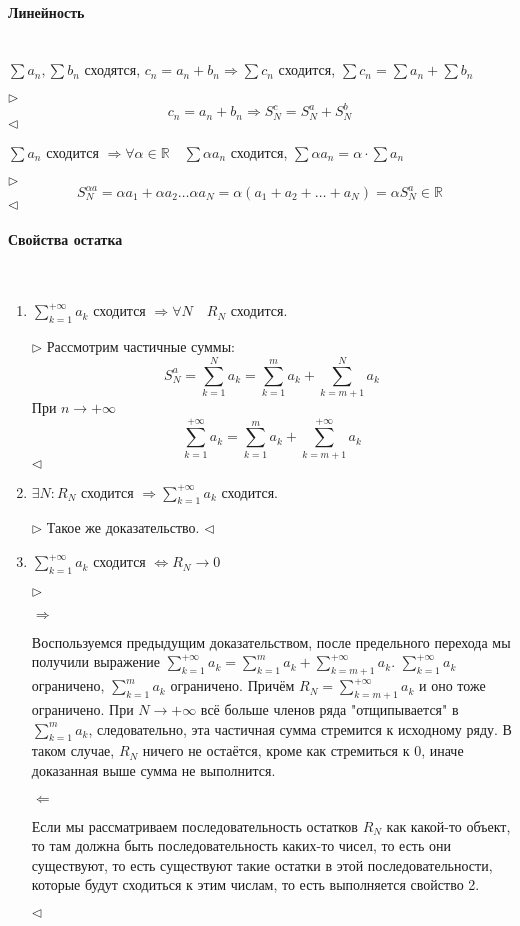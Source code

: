 \documentclass{article}
\let\vanillaparagraph\paragraph
\renewcommand{\paragraph}[1]{\vanillaparagraph{#1}\mbox{}\\}
\begin{document}
\paragraph{Линейность}
$\sum a_n, \sum b_n$ сходятся, $c_n = a_n + b_n \Rightarrow \sum c_n$ сходится, $\sum c_n = \sum a_n + \sum b_n$

$\rhd$
$$
c_n = a_n + b_n \Rightarrow S_N^c = S_N^a + S_N^b
$$
$\lhd$

$\sum a_n$ сходится $\Rightarrow \forall \alpha \in \mathbb{R} \quad \sum \alpha a_n$ сходится, $\sum \alpha a_n = \alpha \cdot \sum a_n$

$\rhd$
$$
S_N^{\alpha a} = \alpha a_1 + \alpha a_2 \ldots \alpha a_N = \alpha (a_1 + a_2 + \ldots + a_N) = \alpha S_N^a \in \mathbb{R}
$$
$\lhd$
\paragraph{Свойства остатка}
\begin{enumerate}
    \item $\sum_{k=1}^{+\infty} a_k$ сходится $\Rightarrow \forall N \quad R_N$ сходится.
    
    $\rhd$
    Рассмотрим частичные суммы:
    $$
    S_N^a = \sum_{k=1}^N a_k = \sum_{k=1}^m a_k + \sum_{k=m+1}^N a_k
    $$
    При $n \rightarrow +\infty$
    $$
    \sum_{k=1}^{+\infty} a_k = \sum_{k=1}^m a_k + \sum_{k=m+1}^{+\infty} a_k
    $$
    $\lhd$
    
    \item $\exists N : R_N$ сходится $\Rightarrow \sum_{k=1}^{+\infty} a_k$ сходится.
    
    $\rhd$
    Такое же доказательство.
    $\lhd$
    
    \item $\sum_{k=1}^{+\infty} a_k$ сходится $\Leftrightarrow R_N \rightarrow 0$
    
    $\rhd$
    
    $\Rightarrow$

    Воспользуемся предыдущим доказательством, после предельного перехода мы получили выражение $\sum_{k=1}^{+\infty} a_k = \sum_{k=1}^m a_k + \sum_{k=m+1}^{+\infty} a_k$. $\sum_{k=1}^{+\infty} a_k$ ограничено, $\sum_{k=1}^m a_k$ ограничено. Причём $R_N = \sum_{k=m+1}^{+\infty} a_k$ и оно тоже ограничено. При $N \rightarrow +\infty$ всё больше членов ряда "отщипывается" в $\sum_{k=1}^m a_k$, следовательно, эта частичная сумма стремится к исходному ряду. В таком случае, $R_N$ ничего не остаётся, кроме как стремиться к 0, иначе доказанная выше сумма не выполнится.

    $\Leftarrow$
    
    Если мы рассматриваем последовательность остатков $R_N$ как какой-то объект, то там должна быть последовательность каких-то чисел, то есть они существуют, то есть существуют такие остатки в этой последовательности, которые будут сходиться к этим числам, то есть выполняется свойство 2.
    
    $\lhd$
\end{enumerate}
\end{document}

